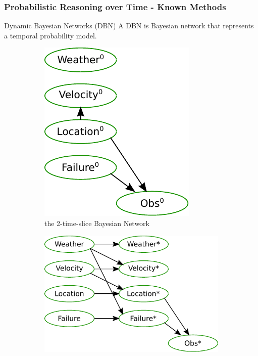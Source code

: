 \begin{frame}[t]
    \frametitle{Probabilistic Reasoning over Time - Known Methods}
    
  	\begin{block}{Dynamic Bayesian Networks (DBN)}
  		A DBN is Bayesian network that represents a temporal probability model.
  	\end{block}
  	
  	\begin{figure}
  		\centering
  		
		\begin{subfigure}[b]{0.18\textwidth}
			\centering
  			\includegraphics[width=\textwidth]{graphics/hmm-intro/dbn-vehicle/zero.pdf}
  			\caption{\tiny{the 2-time-slice Bayesian Network}}
  			\label{fig:2TBN}
  		\end{subfigure}
  		\begin{subfigure}[b]{0.33\textwidth}
			\centering
			\includegraphics[width=\textwidth]{graphics/hmm-intro/dbn-vehicle/transition.pdf}

\end{subfigure}
\end{figure}
\end{frame}
